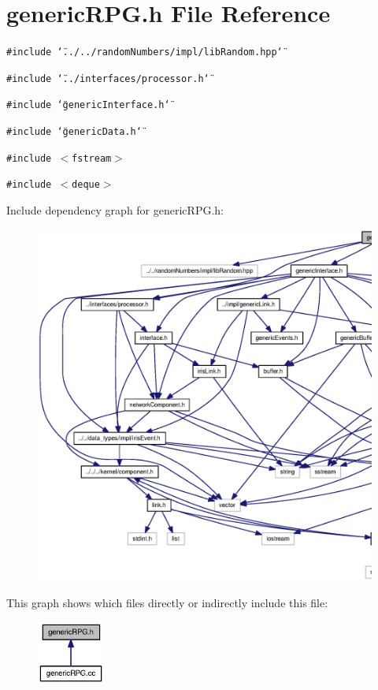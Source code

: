 \section{genericRPG.h File Reference}
\label{genericRPG_8h}
{\tt \#include \char`\"{}../../randomNumbers/impl/libRandom.hpp\char`\"{}}\par
{\tt \#include \char`\"{}../interfaces/processor.h\char`\"{}}\par
{\tt \#include \char`\"{}genericInterface.h\char`\"{}}\par
{\tt \#include \char`\"{}genericData.h\char`\"{}}\par
{\tt \#include $<$fstream$>$}\par
{\tt \#include $<$deque$>$}\par


Include dependency graph for genericRPG.h:\nopagebreak
\begin{figure}[H]
\begin{center}
\leavevmode
\includegraphics[width=420pt]{genericRPG_8h__incl}
\end{center}
\end{figure}


This graph shows which files directly or indirectly include this file:\nopagebreak
\begin{figure}[H]
\begin{center}
\leavevmode
\includegraphics[width=63pt]{genericRPG_8h__dep__incl}
\end{center}
\end{figure}
